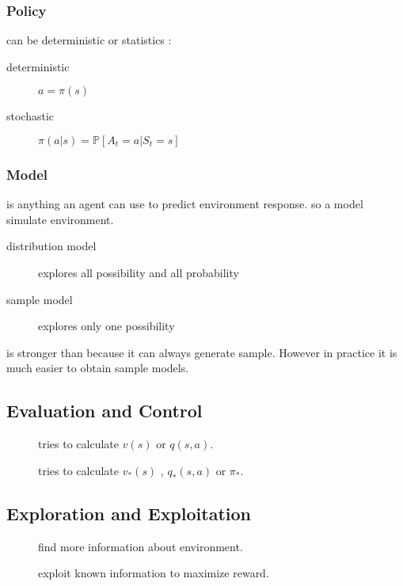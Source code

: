 \subsubsection{Policy}

 can be deterministic or statistics :
\begin{description}
	\item[deterministic] $a = \pi(s)$ 
	\item[stochastic] $\pi(a|s) = \mathbb{P}[A_t=a|S_t=s]$
\end{description}


\subsubsection{Model}
 is anything an agent can use to predict environment response. so a model simulate environment.

\begin{description}
	\item[distribution model] explores all possibility and all probability
	\item[sample model] explores only one possibility
\end{description}

 is stronger than  because it can always generate sample. However in practice it is much easier to obtain sample models.

\subsection{Evaluation and Control}

\begin{description}
	\item[] tries to calculate $v(s)$ or $q(s,a)$.
	\item[] tries to calculate $v_*(s)$ , $q_*(s,a)$ or $\pi_*$.
\end{description}


\subsection{Exploration and Exploitation}

\begin{description}
	\item[] find more information about environment.
	\item[] exploit known information to maximize reward.
\end{description}

